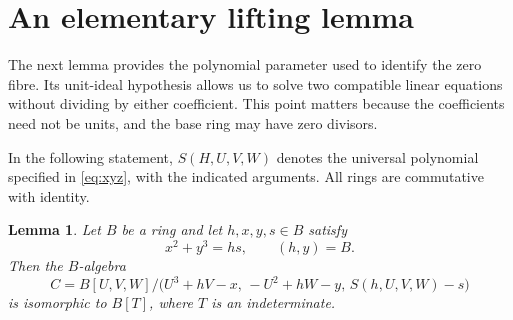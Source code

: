 \documentclass[11pt]{article}
\numberwithin{equation}{section}
\newtheorem{lemma}[theorem]{Lemma}
\begin{document}
\section{An elementary lifting lemma}\label{sec:lifting}

The next lemma provides the polynomial parameter used to identify the zero
fibre. Its unit-ideal hypothesis allows us to solve two compatible linear
equations without dividing by either coefficient. This point matters because
the coefficients need not be units, and the base ring may have zero divisors.

In the following statement, $S(H,U,V,W)$ denotes the universal polynomial
specified in \eqref{eq:xyz}, with the indicated arguments. All rings are
commutative with identity.

\begin{lemma}\label{lem:lift}
Let $B$ be a ring and let $h,x,y,s\in B$ satisfy
\begin{equation}
  x^2+y^3=hs,\qquad (h,y)=B. \label{eq:base}
\end{equation}
Then the $B$-algebra
\[
  C=B[U,V,W]/\bigl(U^3+hV-x,\,-U^2+hW-y,\,
                     S(h,U,V,W)-s\bigr)
\]
is isomorphic to $B[T]$, where $T$ is an indeterminate.
\end{lemma}
\end{document}
